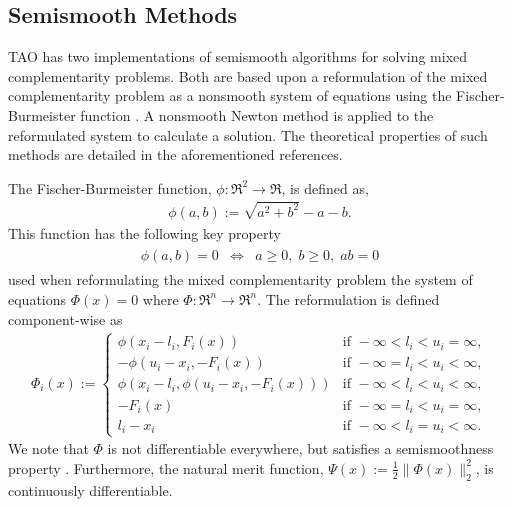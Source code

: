 \subsection{Semismooth Methods}

TAO has two implementations of semismooth algorithms 
\cite{munson.facchinei.ea:semismooth, deluca.facchinei.ea:semismooth, 
facchinei.fischer.ea:semismooth} for solving mixed complementarity problems.
Both are based upon a reformulation of the mixed complementarity problem
as a nonsmooth system of equations using the Fischer-Burmeister 
function \cite{fischer:special}.  A nonsmooth Newton method is applied to
the reformulated system to calculate a solution.  The theoretical properties
of such methods are detailed in the aforementioned references.

The Fischer-Burmeister function, $\phi:\Re^2 \to \Re$, is defined as,
\begin{eqnarray*}
\phi(a,b) := \sqrt{a^2 + b^2} - a - b.
\end{eqnarray*}
This function has the following key property
\begin{eqnarray*}
\begin{array}{lcr}
        \phi(a,b) = 0 & \Leftrightarrow & a \geq 0,\; b \geq 0,\; ab = 0
\end{array}
\end{eqnarray*}
used when reformulating the mixed complementarity problem the system of 
equations $\Phi(x) = 0$ where $\Phi:\Re^n \to \Re^n$.  
The reformulation is defined component-wise as
\begin{eqnarray*}
\Phi_i(x) := \left\{ \begin{array}{ll}
   \phi(x_i - l_i, F_i(x)) & \mbox{if } -\infty < l_i < u_i = \infty, \\
   -\phi(u_i-x_i, -F_i(x)) & \mbox{if } -\infty = l_i < u_i < \infty, \\
   \phi(x_i - l_i, \phi(u_i - x_i, - F_i(x))) & \mbox{if } -\infty < l_i < u_i < \infty, \\
   -F_i(x) & \mbox{if } -\infty = l_i < u_i = \infty, \\
   l_i - x_i & \mbox{if } -\infty < l_i = u_i < \infty.
   \end{array} \right.
\end{eqnarray*}
We note that $\Phi$ is not differentiable everywhere, but satisfies a
semismoothness property 
\cite{mifflin:semismooth, qi:convergence, qi.sun:nonsmooth}.  Furthermore,
the natural merit function, $\Psi(x) := \frac{1}{2} \| \Phi(x) \|_2^2$, is 
continuously differentiable.

